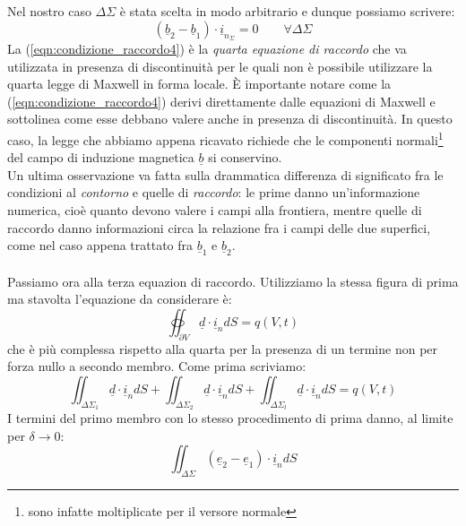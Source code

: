 \documentclass{book}
\begin{document}
        Nel nostro caso $\Delta \Sigma$ è stata scelta in modo arbitrario e dunque possiamo scrivere:
        \begin{equation}
        \label{eqn:condizione_raccordo4}
            (\underline{b}_{2}-\underline{b}_{1}) \cdot \underline{i}_{n_{\Sigma}} = 0 \quad \quad \forall \Delta \Sigma
        \end{equation}
        La (\ref{eqn:condizione_raccordo4}) è la \textit{quarta equazione di raccordo} che va utilizzata in presenza di discontinuità per le quali non è possibile utilizzare la quarta legge di Maxwell in forma locale. È importante notare come la (\ref{eqn:condizione_raccordo4}) derivi direttamente dalle equazioni di Maxwell e sottolinea come esse debbano valere anche in presenza di discontinuità. In questo caso, la legge che abbiamo appena ricavato richiede che le componenti normali\footnote{sono infatte moltiplicate per il versore normale} del campo di induzione magnetica $\underline{b}$ si conservino. \\
        Un ultima osservazione va fatta sulla drammatica differenza di significato fra le condizioni al \textit{contorno} e quelle di \textit{raccordo}: le prime danno un'informazione numerica, cioè quanto devono valere i campi alla frontiera, mentre quelle di raccordo danno informazioni circa la relazione fra i campi delle due superfici, come nel caso appena trattato fra $\underline{b}_{1}$ e $\underline{b}_{2}$. \\ \\
        Passiamo ora alla terza equazion di raccordo. Utilizziamo la stessa figura di prima ma stavolta l'equazione da considerare è:
        \begin{equation}
            \oiint_{\partial V} \underline{d} \cdot \underline{i}_{n} dS = q(V, t)
        \end{equation}
        che è più complessa rispetto alla quarta per la presenza di un termine non per forza nullo a secondo membro. \newpage Come prima scriviamo:
        \begin{equation}
            \iint_{\Delta \Sigma_{1}} \underline{d} \cdot \underline{i}_{n} dS + \iint_{\Delta \Sigma_{2}} \underline{d} \cdot \underline{i}_{n} dS + \iint_{\Delta \Sigma_{l}} \underline{d} \cdot \underline{i}_{n}  dS= q(V,t) 
        \end{equation}
        I termini del primo membro con lo stesso procedimento di prima danno, al limite per $\delta \to 0$:
        \begin{equation}
            \iint_{\Delta \Sigma} (\underline{e}_{2}-\underline{e}_{1}) \cdot \underline{i}_{n} dS
        \end{equation}
\end{document}
